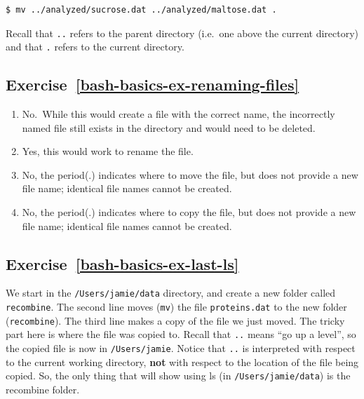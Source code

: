 \documentclass[
]{krantz}
\providecommand{\tightlist}{%
  \setlength{\itemsep}{0pt}\setlength{\parskip}{0pt}}
\begin{document}
\begin{verbatim}
$ mv ../analyzed/sucrose.dat ../analyzed/maltose.dat .
\end{verbatim}

Recall that \texttt{..} refers to the parent directory (i.e.~one above the current directory)
and that \texttt{.} refers to the current directory.

\hypertarget{exercise-refbash-basics-ex-renaming-files}{%
\subsection*{Exercise~\ref{bash-basics-ex-renaming-files}}\label{exercise-refbash-basics-ex-renaming-files}}


\begin{enumerate}
\def\labelenumi{\arabic{enumi}.}
\tightlist
\item
  No.~While this would create a file with the correct name,
  the incorrectly named file still exists in the directory and would need to be deleted.
\item
  Yes, this would work to rename the file.
\item
  No, the period(.) indicates where to move the file, but does not provide a new file name;
  identical file names cannot be created.
\item
  No, the period(.) indicates where to copy the file, but does not provide a new file name;
  identical file names cannot be created.
\end{enumerate}

\hypertarget{exercise-refbash-basics-ex-last-ls}{%
\subsection*{Exercise~\ref{bash-basics-ex-last-ls}}\label{exercise-refbash-basics-ex-last-ls}}


We start in the \texttt{/Users/jamie/data} directory, and create a new folder called \texttt{recombine}.
The second line moves (\texttt{mv}) the file \texttt{proteins.dat} to the new folder (\texttt{recombine}).
The third line makes a copy of the file we just moved. The tricky part here is where the file was
copied to. Recall that \texttt{..} means ``go up a level'', so the copied file is now in \texttt{/Users/jamie}.
Notice that \texttt{..} is interpreted with respect to the current working
directory, \textbf{not} with respect to the location of the file being copied.
So, the only thing that will show using ls (in \texttt{/Users/jamie/data}) is the recombine folder.
\end{document}
